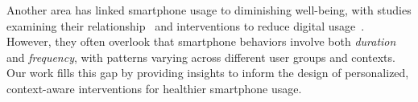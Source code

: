  Another area has linked smartphone usage to diminishing well-being, with studies examining their relationship~\cite{buchi2024digital, allcott2022digital, peper2018digital, thomas2022digital} and interventions to reduce digital usage~\cite{lyngs2020just, orzikulova2023finerme, roffarello2023achieving, zimmermann2023digital}. 
 However, they often overlook that smartphone behaviors involve both \textit{duration} and \textit{frequency}, with patterns varying across different user groups and contexts. Our work fills this gap by providing insights to inform the design of personalized, context-aware interventions for healthier smartphone usage.


